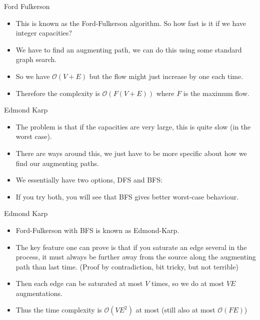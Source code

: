 \documentclass{beamer}
\begin{document}
	\begin{frame}[plain]{Ford Fulkerson}
		\begin{itemize}
			\item This is known as the Ford-Fulkerson algorithm. So how fast is it if we have integer capacities?
			\item We have to find an augmenting path, we can do this using some standard graph search.
			\item<2-> So we have $\mathcal{O}(V + E)$ but the flow might just increase by one each time.
			\item<2-> Therefore the complexity is $\mathcal{O}(F(V + E))$ where $F$ is the maximum flow.
		\end{itemize}
	\end{frame}
	
	\begin{frame}[plain]{Edmond Karp}
		\begin{itemize}
			\item The problem is that if the capacities are very large, this is quite slow (in the worst case).
			\item There are ways around this, we just have to be more specific about how we find our augmenting paths.
			\item We essentially have two options, DFS and BFS:
			\item If you try both, you will see that BFS gives better worst-case behaviour.
		\end{itemize}
	\end{frame}
	
	\begin{frame}[plain]{Edmond Karp}
		\begin{itemize}
			\item Ford-Fulkerson with BFS is known as Edmond-Karp.
			\item The key feature one can prove is that if you saturate an edge several in the process, it must always be further away from the source along the augmenting path than last time. (Proof by contradiction, bit tricky, but not terrible)
			\item Then each edge can be saturated at most $V$ times, so we do at most $VE$ augmentations.
			\item Thus the time complexity is $\mathcal{O}(VE^2)$ at most (still also at most $\mathcal{O}(FE)$)
		\end{itemize}
	\end{frame}
	
\end{document}
